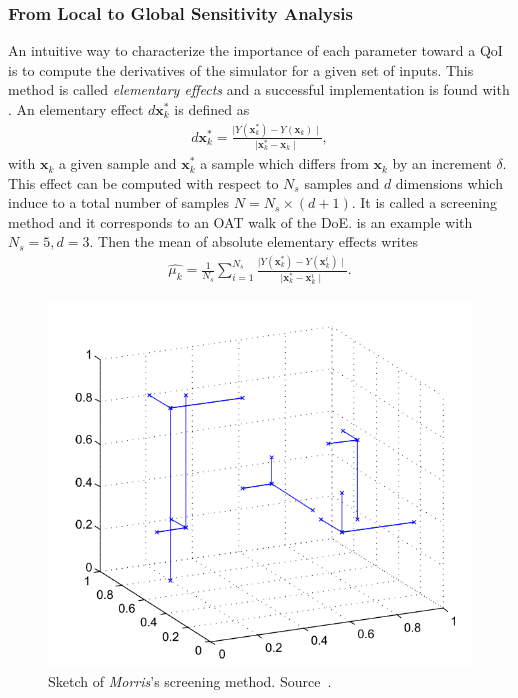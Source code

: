 \subsubsection{From Local to Global Sensitivity Analysis}

An intuitive way to characterize the importance of each parameter toward a QoI is to compute the derivatives of the simulator for a given set of inputs. This method is called \emph{elementary effects} and a successful implementation is found with \citet{morris1991}. An elementary effect $d\mathbf{x}_{k}^*$ is defined as
\begin{align}
d\mathbf{x}_{k}^* = \frac{ \mid Y(\mathbf{x}_{k}^*) -  Y(\mathbf{x}_{k}) \mid}{\mid \mathbf{x}_{k}^* - \mathbf{x}_{k}  \mid},
\end{align}
\noindent with $\mathbf{x}_{k}$ a given sample and $\mathbf{x}_{k}^*$ a sample which differs from $\mathbf{x}_{k}$ by an increment $\delta$. This effect can be computed with respect to $N_s$ samples and $d$ dimensions which induce to a total number of samples $N = N_s\times(d + 1)$. It is called a screening method and it corresponds to an OAT walk of the DoE.  is an example with $N_s = 5, d = 3$. Then the mean of absolute elementary effects writes
\begin{align}
\hat{\mu_k} = \frac{1}{N_s} \sum_{i=1}^{N_s} \frac{ \mid Y(\mathbf{x}_{k}^*) -  Y(\mathbf{x}_{k}^i) \mid}{\mid \mathbf{x}_{k}^* - \mathbf{x}_{k}^i  \mid}.
\end{align}

\begin{figure}[!ht]
\centering
\includegraphics[width=0.8\linewidth,keepaspectratio]{fig/literature/morris.png}
\caption{Sketch of \emph{Morris}'s screening method. Source~\cite{Becker2018}.}
\label{fig:morris}
\end{figure}

